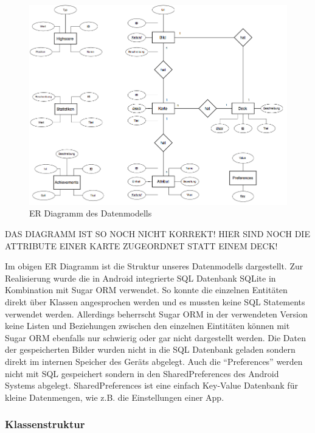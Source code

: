 \documentclass{scrartcl}
\begin{document}
\begin{figure}[h]
  \centering
  \includegraphics[width=\textwidth]{img/map_er.png}
  \caption{ER Diagramm des Datenmodells}
\end{figure}

DAS DIAGRAMM IST SO NOCH NICHT KORREKT! HIER SIND NOCH DIE ATTRIBUTE EINER KARTE
ZUGEORDNET STATT EINEM DECK!

\noindent
Im obigen ER Diagramm ist die Struktur unseres Datenmodells dargestellt. Zur
Realisierung wurde die in Android integrierte SQL Datenbank SQLite in
Kombination mit Sugar ORM verwendet. So konnte die einzelnen Entitäten direkt
über Klassen angesprochen werden und es mussten keine SQL Statements verwendet
werden. Allerdings beherrscht Sugar ORM in der verwendeten Version keine Listen
und Beziehungen zwischen den einzelnen Eintitäten können mit Sugar ORM ebenfalls
nur schwierig oder gar nicht dargestellt werden. Die Daten der gespeicherten
Bilder wurden nicht in die SQL Datenbank geladen sondern direkt im internen
Speicher des Geräts abgelegt. Auch die \enquote{Preferences} werden nicht mit
SQL gespeichert sondern in den SharedPreferences des Android Systems abgelegt.
SharedPreferences ist eine einfach Key-Value Datenbank für kleine Datenmengen,
wie z.B. die Einstellungen einer App.

\subsubsection{Klassenstruktur}
\end{document}
